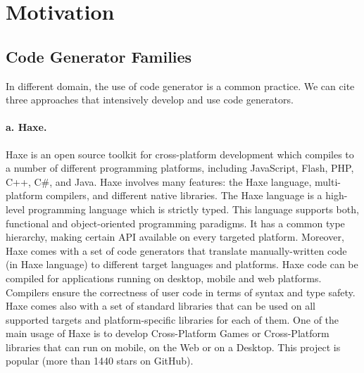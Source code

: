 
\section{Motivation}

\subsection{Code Generator Families}

In different domain, the use of code generator is a common practice. We can cite three approaches that intensively develop and use code generators. 

\paragraph{a. Haxe.} 	Haxe is an open source toolkit for cross-platform development which compiles to a number of different programming platforms, including JavaScript, Flash, PHP, C++, C\#, and Java. Haxe involves many features: the Haxe language, multi-platform compilers, and different native libraries. The Haxe language is a high-level programming language which is strictly typed. This language supports both, functional and object-oriented programming paradigms. It has a common type hierarchy, making certain API available on every targeted platform. Moreover, Haxe comes with a set of code generators that translate manually-written code (in Haxe language) to different target languages and platforms.  Haxe code can be compiled for applications running on desktop, mobile and web platforms. Compilers ensure the correctness of user code in terms of syntax and type safety. Haxe comes also with a set of standard libraries that can be used on all supported targets and platform-specific libraries for each of them. One of the main usage of Haxe is to develop Cross-Platform Games or Cross-Platform libraries that can run on mobile, on the Web or on a Desktop.  	This project is popular (more than \num{1440} stars on GitHub).

